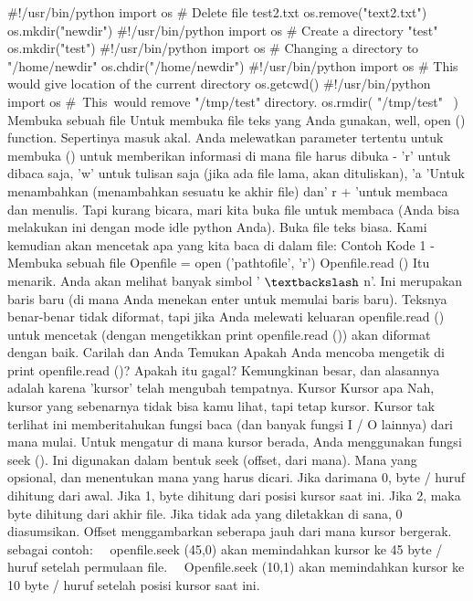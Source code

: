  $  \#  $!/usr/bin/python
import os 
 $  \#  $ Delete file test2.txt 
os.remove("text2.txt")
os.mkdir("newdir")
 $  \#  $!/usr/bin/python
import os
 $  \#  $ Create a directory "test" 
os.mkdir("test")
 $  \#  $!/usr/bin/python
import os 
 $  \#  $ Changing a directory to "/home/newdir"
os.chdir("/home/newdir") 
 $  \#  $!/usr/bin/python
import os 
 $  \#  $ This would give location of the current directory 
os.getcwd()
 $  \#  $!/usr/bin/python 
import os 
 $  \#  $~This~would  remove "/tmp/test"  directory. 
os.rmdir( "/tmp/test"~ )
Membuka sebuah file
Untuk membuka file teks yang Anda gunakan, well, open () function. Sepertinya masuk akal. Anda melewatkan parameter tertentu untuk membuka () untuk memberikan informasi di mana file harus dibuka - 'r' untuk dibaca saja, 'w' untuk tulisan saja (jika ada file lama, akan dituliskan), 'a 'Untuk menambahkan (menambahkan sesuatu ke akhir file) dan' r + 'untuk membaca dan menulis. Tapi kurang bicara, mari kita buka file untuk membaca (Anda bisa melakukan ini dengan mode idle python Anda). Buka file teks biasa. Kami kemudian akan mencetak apa yang kita baca di dalam file: 
Contoh Kode 1 - Membuka sebuah file 
Openfile = open ('pathtofile', 'r') 
Openfile.read () 
Itu menarik. Anda akan melihat banyak simbol ' $  \textbackslash  $ n'. Ini merupakan baris baru (di mana Anda menekan enter untuk memulai baris baru). Teksnya benar-benar tidak diformat, tapi jika Anda melewati keluaran openfile.read () untuk mencetak (dengan mengetikkan print openfile.read ()) akan diformat dengan baik.
Carilah dan Anda Temukan 
Apakah Anda mencoba mengetik di print openfile.read ()? Apakah itu gagal? Kemungkinan besar, dan alasannya adalah karena 'kursor' telah mengubah tempatnya. Kursor Kursor apa Nah, kursor yang sebenarnya tidak bisa kamu lihat, tapi tetap kursor. Kursor tak terlihat ini memberitahukan fungsi baca (dan banyak fungsi I / O lainnya) dari mana mulai. Untuk mengatur di mana kursor berada, Anda menggunakan fungsi seek (). Ini digunakan dalam bentuk seek (offset, dari mana). 
Mana yang opsional, dan menentukan mana yang harus dicari. Jika darimana 0, byte / huruf dihitung dari awal. Jika 1, byte dihitung dari posisi kursor saat ini. Jika 2, maka byte dihitung dari akhir file. Jika tidak ada yang diletakkan di sana, 0 diasumsikan.
Offset menggambarkan seberapa jauh dari mana kursor bergerak. sebagai contoh: 
 $  $ $  $ $  $ $  $openfile.seek (45,0) akan memindahkan kursor ke 45 byte / huruf setelah permulaan file.
 $  $ $  $ $  $ $  $Openfile.seek (10,1) akan memindahkan kursor ke 10 byte / huruf setelah posisi kursor saat ini.
